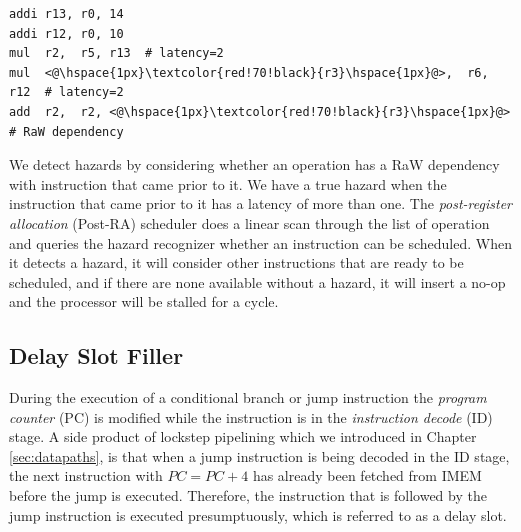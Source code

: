 \lstset{style=customasm}
\begin{lstlisting}
addi r13, r0, 14
addi r12, r0, 10
mul  r2,  r5, r13  # latency=2
mul  <@\hspace{1px}\textcolor{red!70!black}{r3}\hspace{1px}@>,  r6, r12  # latency=2
add  r2,  r2, <@\hspace{1px}\textcolor{red!70!black}{r3}\hspace{1px}@>   # RaW dependency
\end{lstlisting}

We detect hazards by considering whether an operation has a RaW dependency with instruction that came prior to it. We have a true hazard when the instruction that came prior to it has a latency of more than one. The \emph{post-register allocation} (Post-RA) scheduler does a linear scan through the list of operation and queries the hazard recognizer whether an instruction can be scheduled. When it detects a hazard, it will consider other instructions that are ready to be scheduled, and if there are none available without a hazard, it will insert a no-op and the processor will be stalled for a cycle.

\subsection{Delay Slot Filler}
During the execution of a conditional branch or jump instruction the \emph{program counter} (PC) is modified while the instruction is in the \emph{instruction decode} (ID) stage. A side product of lockstep pipelining which we introduced in Chapter \ref{sec:datapaths}, is that when a jump instruction is being decoded in the ID stage, the next instruction with $PC = PC+4$ has already been fetched from IMEM before the jump is executed. Therefore, the instruction that is followed by the jump instruction is executed presumptuously, which is referred to as a delay slot.


